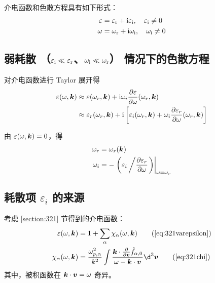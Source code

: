 介电函数和色散方程具有如下形式：
\begin{subequations}\begin{align}
\varepsilon &= \varepsilon_{\mathrm{r}} + \mathrm{i} \varepsilon_{\mathrm{i}}, \quad \varepsilon_{\mathrm{i}} \neq 0 \\
\omega &= \omega_{\mathrm{r}} + \mathrm{i} \omega_{\mathrm{i}}, \quad \omega_{\mathrm{i}} \neq 0
\end{align}\end{subequations}

\subsection{
    弱耗散
    \texorpdfstring{（$\varepsilon_{\mathrm{i}} \ll \varepsilon_{\mathrm{r}}$、$\omega_{\mathrm{i}} \ll \omega_{\mathrm{r}}$）}{}
    情况下的色散方程
}

对介电函数进行 Taylor 展开得
\begin{equation}\begin{aligned}
\varepsilon(\omega, \bm{k})
&\approx \varepsilon(\omega_r, \bm{k})
+ \mathrm{i} \omega_i \pdv{\varepsilon}{\omega}(\omega_r, \bm{k}) \\
&\approx \varepsilon_r(\omega_r, \bm{k})
+ \mathrm{i} \left[ \varepsilon_i(\omega_r, \bm{k})
+ \omega_i \pdv{\varepsilon_r}{\omega}(\omega_r, \bm{k}) \right]
\end{aligned}\end{equation}

由 $\varepsilon(\omega, \bm{k}) = 0$，得
\begin{subequations}\begin{align}
\omega_r &= \omega_r(\bm{k}) \\
\omega_i &= - \left.\left(
    \varepsilon_i \left/ \pdv{\varepsilon_r}{\omega} \right.
\right)\right|_{\omega=\omega_r}
\end{align}\end{subequations}

\subsection{耗散项 \texorpdfstring{$\varepsilon_i$}{} 的来源}

考虑 \ref{section:321} 节得到的介电函数：
\begin{subequations}\begin{align}
\varepsilon(\omega, \vector{k}) &= 1 + \sum_\alpha \chi_\alpha(\omega, \vector{k}) \tag{\ref{eq:321varepsilon}}\\
\chi_\alpha(\omega, \vector{k})
&= \frac{\omega_{p,\alpha}^2}{k^2}
\int \frac{\vector{k} \cdot \pdv{}{\vector{v}} \hat{f}_{\alpha,0}}{\omega - \vector{k} \cdot \vector{v}} \d^3 \vector{v} \tag{\ref{eq:321chi}}
\end{align}\end{subequations}
其中，被积函数在 $\bm{k} \cdot \bm{v} = \omega$ 奇异。

